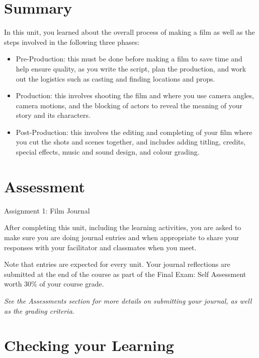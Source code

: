 \documentclass[
]{book}
\providecommand{\tightlist}{%
  \setlength{\itemsep}{0pt}\setlength{\parskip}{0pt}}
\begin{document}
\hypertarget{summary-1}{%
\section*{Summary}\label{summary-1}}

In this unit, you learned about the overall process of making a film as well as the steps involved in the following three phases:

\begin{itemize}
\tightlist
\item
  Pre-Production: this must be done before making a film to save time and help ensure quality, as you write the script, plan the production, and work out the logistics such as casting and finding locations and props.
\item
  Production: this involves shooting the film and where you use camera angles, camera motions, and the blocking of actors to reveal the meaning of your story and its characters.
\item
  Post-Production: this involves the editing and completing of your film where you cut the shots and scenes together, and includes adding titling, credits, special effects, music and sound design, and colour grading.
\end{itemize}

\hypertarget{assessment-3}{%
\section*{Assessment}\label{assessment-3}}

\begin{assessment}
{Assignment 1: Film Journal}

After completing this unit, including the learning activities, you are asked to make sure you are doing journal entries and when appropriate to share your responses with your facilitator and classmates when you meet.

Note that entries are expected for every unit. Your journal reflections are submitted at the end of the course as part of the Final Exam: Self Assessment worth 30\% of your course grade.

\emph{See the Assessments section for more details on submitting your journal, as well as the grading criteria.}
\end{assessment}

\hypertarget{checking-your-learning-1}{%
\section*{Checking your Learning}\label{checking-your-learning-1}}
\end{document}
